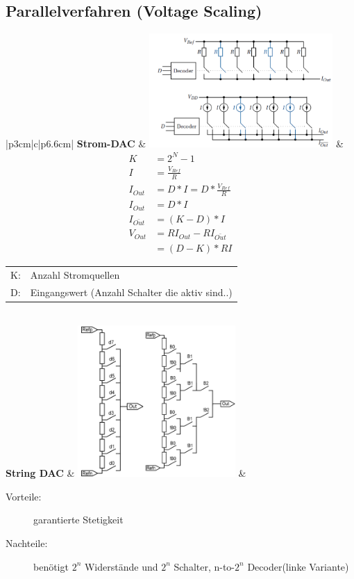 \subsection{Parallelverfahren (Voltage Scaling)}
\begin{longtable}{|p{3cm}|c|p{6.6cm}|}
	\hline
	\textbf{Strom-DAC} \hartl{456} 
	& \includegraphics[width=7cm, valign=t]{pictures/Strom-DAC}
	& {\begin{align*}
		K &=2^N-1\\
		I &=\frac{V_{Ref}}{R}\\
		I_{Out} &=D*I=D*\frac{V_{Ref}}{R}\\
		I_{Out} &=D*I\\
		I_{\bar{Out}} &=(K-D)*I\\
		V_{Out} &=RI_{Out}-RI_{\bar{Out}} \\
			    &=(D-K)*RI		
	  \end{align*}}
	  \begin{tabular}{lp{5cm}}
	  	K: & Anzahl Stromquellen \\
      	D: & Eingangswert (Anzahl Schalter die aktiv sind..)
      \end{tabular}
	\\ \hline
	\textbf{String DAC} 
	& \includegraphics[width=6cm, valign=t]{pictures/string_DAC}
	& \begin{description}
  		\item[Vorteile: ] garantierte Stetigkeit
  		\item[Nachteile:] benötigt $2^n$ Widerstände und $2^n$ Schalter, n-to-$2^n$ Decoder(linke Variante)

\end{description}
\end{longtable}
